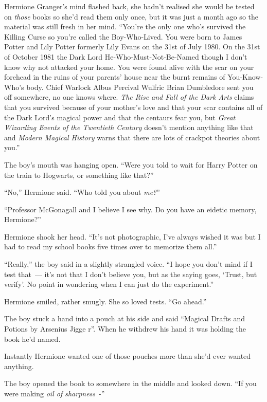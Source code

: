 Hermione Granger's mind flashed back, she hadn't realised she would be tested on \emph{those} books so she'd read them only once, but it was just a month ago so the material was still fresh in her mind. ``You're the only one who's survived the Killing Curse so you're called the Boy-Who-Lived. You were born to James Potter and Lily Potter formerly Lily Evans on the 31st of July 1980. On the 31st of October 1981 the Dark Lord He-Who-Must-Not-Be-Named though I don't know why not attacked your home. You were found alive with the scar on your forehead in the ruins of your parents' house near the burnt remains of You-Know-Who's body. Chief Warlock Albus Percival Wulfric Brian Dumbledore sent you off somewhere, no one knows where. \emph{The Rise and Fall of the Dark Arts} claims that you survived because of your mother's love and that your scar contains all of the Dark Lord's magical power and that the centaurs fear you, but \emph{Great Wizarding Events of the Twentieth Century} doesn't mention anything like that and \emph{Modern Magical History} warns that there are lots of crackpot theories about you.''

The boy's mouth was hanging open. ``Were you told to wait for Harry Potter on the train to Hogwarts, or something like that?''

``No,'' Hermione said. ``Who told you about \emph{me?}''

``Professor McGonagall and I believe I see why. Do you have an eidetic memory, Hermione?''

Hermione shook her head. ``It's not photographic, I've always wished it was but I had to read my school books five times over to memorize them all.''

``Really,'' the boy said in a slightly strangled voice. ``I hope you don't mind if I test that~--- it's not that I don't believe you, but as the saying goes, `Trust, but verify'. No point in wondering when I can just do the experiment.''

Hermione smiled, rather smugly. She so loved tests. ``Go ahead.''

The boy stuck a hand into a pouch at his side and said ``Magical Drafts and Potions by Arsenius Jigge r''. When he withdrew his hand it was holding the book he'd named.

Instantly Hermione wanted one of those pouches more than she'd ever wanted anything.

The boy opened the book to somewhere in the middle and looked down. ``If you were making \emph{oil of sharpness}~-''

